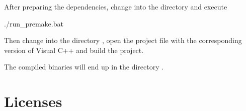 After preparing the dependencies, change into the directory
 and execute

\begin{VerbatimBoth}
  ./run_premake.bat
\end{VerbatimBoth}

Then change into the directory , open the
project file with the corresponding version of Visual C++ and build
the project.

The compiled binaries will end up in the directory .

\chapter{Licenses}

\scriptsize

\normalsize

\scriptsize

\normalsize




